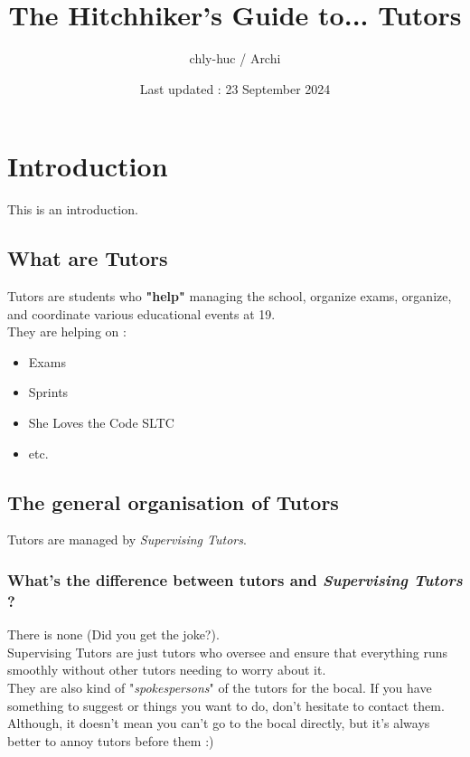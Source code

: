 \documentclass{article}
\title{The Hitchhiker's Guide to... Tutors}
\author{chly-huc / Archi}
\date{Last updated : 23 September 2024}
\begin{document}
\maketitle

{
  \tableofcontents
}

\section{Introduction}

This is an introduction.

\subsection{What are Tutors}

Tutors are students who \textbf{"help"} managing the school, organize exams, organize, and coordinate various educational events at 19.\\

They are helping on :
\begin{itemize}
    \item Exams
    \item Sprints
    \item She Loves the Code SLTC
    \item etc.
\end{itemize}


\subsection{The general organisation of Tutors}

Tutors are managed by \textit{Supervising Tutors}.

\subsubsection{What's the difference between tutors and \textit{Supervising Tutors} ?}

There is none (Did you get the joke?). \\
Supervising Tutors are just tutors who oversee and ensure that everything runs smoothly without other tutors needing to worry about it. \\

They are also kind of "\textit{spokespersons}" of the tutors for the bocal. If you have something to suggest or things you want to do, don't hesitate to contact them.
Although, it doesn't mean you can't go to the bocal directly, but it's always better to annoy tutors before them :) \\
\end{document}
